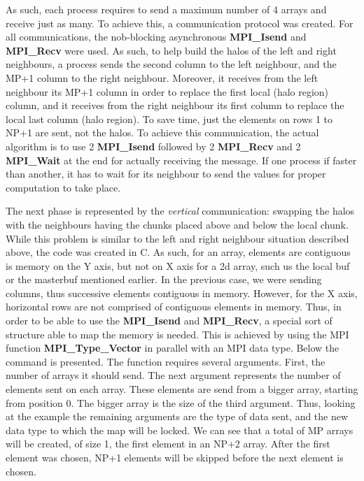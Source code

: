 \documentclass[11pt]{article}
\begin{document}
	As such, each process requires to send a maximum number of 4 arrays and receive just as many. To achieve this, a communication protocol was created. For all communications, the nob-blocking asynchronous \textbf{MPI\_Isend} and \textbf{MPI\_Recv} were used. As such, to help build the halos of the left and right neighbours, a process sends the second column to the left neighbour, and the MP+1 column to the right neighbour. Moreover, it receives from the left neighbour its MP+1 column in order to replace the first local (halo region) column, and it receives from the right neighbour its first column to replace the local last column (halo region). To save time, just the elements on rows 1 to NP+1 are sent, not the halos. To achieve this communication, the actual algorithm is to use 2 \textbf{MPI\_Isend} followed by 2 \textbf{MPI\_Recv} and 2 \textbf{MPI\_Wait} at the end for actually receiving the message. If one process if faster than another, it has to wait for its neighbour to send the values for proper computation to take place.
	
	The next phase is represented by the \textit{vertical} communication: swapping the halos with the neighbours having the chunks placed above and below the local chunk. While this problem is similar to the left and right neighbour situation described above, the code was created in C. As such, for an array, elements are contiguous is memory on the Y axis, but not on X axis for a 2d array, such us the local buf or the masterbuf mentioned earlier. In the previous case, we were sending columns, thus successive elements contiguous in memory. However, for the X axis, horizontal rows are not comprised of contiguous elements in memory. Thus, in order to be able to use the \textbf{MPI\_Isend} and \textbf{MPI\_Recv}, a special sort of structure able to map the memory is needed. This is achieved by using the MPI function \textbf{MPI\_Type\_Vector} in parallel with an MPI data type. Below the command is presented. The function requires several arguments. First, the number of arrays it should send. The next argument represents the number of elements sent on each array. These elements are send from a bigger array, starting from position 0. The bigger array is the size of the third argument. Thus, looking at the example the remaining arguments are the type of data sent, and the new data type to which the map will be locked. We can see that a total of MP arrays will be created, of size 1, the first element in an NP+2 array. After the first element was chosen, NP+1 elements will be skipped before the next element is chosen. 
	
\end{document}
